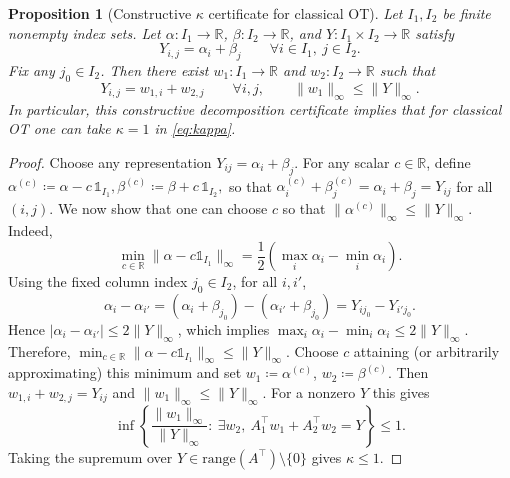 \documentclass{article}
\theoremstyle{plain}
\newtheorem{proposition}{Proposition}[section]
\newcommand{\ones}{\mathds{1}}
\newcommand{\RR}{\mathbb{R}}
\begin{document}
\begin{proposition}[Constructive $\kappa$ certificate for classical OT]\label{app-prop:kappa-ot}
Let $I_1,I_2$ be finite nonempty index sets.  Let
$\alpha:I_1\to\RR$, $\beta:I_2\to\RR$, and
$Y:I_1\times I_2\to\RR$ satisfy
\[
  Y_{i,j}=\alpha_i+\beta_j\qquad\forall i\in I_1,\ j\in I_2 .
\]
Fix any $j_0\in I_2$.  Then there exist
$w_1:I_1\to\RR$ and $w_2:I_2\to\RR$ such that
\[
  Y_{i,j}=w_{1,i}+w_{2,j}\qquad\forall i,j,
  \qquad
  \|w_1\|_\infty\le \|Y\|_\infty .
\]
In particular, this constructive decomposition certificate implies that for
classical OT one can take $\kappa=1$ in \eqref{eq:kappa}.
\end{proposition}

\begin{proof}
Choose any representation $Y_{ij}=\alpha_i+\beta_j$.
For any scalar $c\in\RR$, define 
$
\alpha^{(c)} \coloneqq \alpha-c\,\ones_{I_1}, \beta^{(c)} \coloneqq \beta+c\,\ones_{I_2},
$
so that $\alpha^{(c)}_i+\beta^{(c)}_j=\alpha_i+\beta_j=Y_{ij}$ for all $(i,j)$.
%
We now show that one can choose $c$ so that $\|\alpha^{(c)}\|_\infty\le \|Y\|_\infty$.
Indeed,
\[
\min_{c\in\RR}\|\alpha-c\ones_{I_1}\|_\infty = \frac{1}{2}\left(\max_{i}\alpha_i-\min_{i}\alpha_i\right).
\]
Using the fixed column index $j_0\in I_2$, for all $i,i'$,
\[
\alpha_i-\alpha_{i'} = (\alpha_i+\beta_{j_0})-(\alpha_{i'}+\beta_{j_0}) = Y_{i j_0}-Y_{i' j_0}.
\]
Hence $|\alpha_i-\alpha_{i'}|\le 2\|Y\|_\infty$, which implies
$\max_i\alpha_i-\min_i\alpha_i \le 2\|Y\|_\infty$. Therefore,
$
\min_{c\in\RR}\|\alpha-c\ones_{I_1}\|_\infty \le \|Y\|_\infty.
$
Choose $c$ attaining (or arbitrarily approximating) this minimum and set
$w_1 \coloneqq \alpha^{(c)}$, $w_2 \coloneqq \beta^{(c)}$.
Then $w_{1,i}+w_{2,j}=Y_{ij}$ and $\|w_1\|_\infty\le \|Y\|_\infty$.
For a nonzero $Y$ this gives
\[
\inf\left\{\frac{\|w_1\|_\infty}{\|Y\|_\infty}:\ \exists w_2,\ A_1^\top w_1 + A_2^\top w_2 = Y\right\}\le 1.
\]
Taking the supremum over $Y\in\mathrm{range}(A^\top)\setminus\{0\}$ gives $\kappa\le 1$.
\end{proof}
\end{document}
